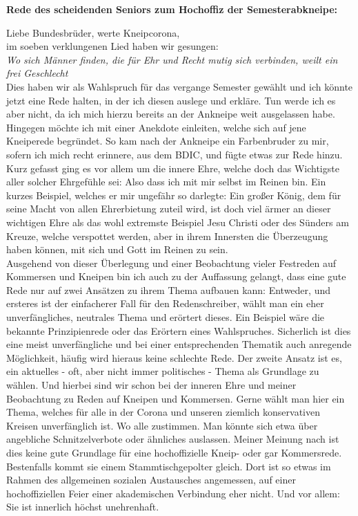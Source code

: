 \begin{multicols}{2}
\textbf{Rede des scheidenden Seniors zum Hochoffiz der Semesterabkneipe:}

Liebe Bundesbrüder, werte Kneipcorona,
\\
im soeben verklungenen Lied haben wir gesungen:
\\
\glqq\textit{Wo sich Männer finden, die für Ehr und Recht
mutig sich verbinden, weilt ein frei Geschlecht}\grqq
\\
Dies haben wir als Wahlspruch für das vergange Semester gewählt und ich könnte jetzt eine Rede halten, in der ich diesen auslege und erkläre. Tun werde ich es aber nicht, da ich mich hierzu bereits an der Ankneipe weit ausgelassen habe.
Hingegen möchte ich mit einer Anekdote einleiten, welche sich auf jene Kneiperede begründet. So kam nach der Ankneipe ein Farbenbruder zu mir, sofern ich mich recht erinnere, aus dem BDIC, und fügte etwas zur Rede hinzu. Kurz gefasst ging es vor allem um die innere Ehre, welche doch das Wichtigste aller solcher Ehrgefühle sei: Also dass ich mit mir selbst im Reinen bin. Ein kurzes Beispiel, welches er mir ungefähr so darlegte: Ein großer König, dem für seine Macht von allen Ehrerbietung zuteil wird, ist doch viel ärmer an dieser wichtigen Ehre als das wohl extremste Beispiel Jesu Christi oder des Sünders am Kreuze, welche verspottet werden, aber in ihrem Innersten die Überzeugung haben können, mit sich und Gott im Reinen zu sein.
\\
Ausgehend von dieser Überlegung und einer Beobachtung vieler Festreden auf Kommersen und Kneipen bin ich auch zu der Auffassung gelangt, dass eine gute Rede nur auf zwei Ansätzen zu ihrem Thema aufbauen kann: Entweder, und ersteres ist der einfacherer Fall für den Redenschreiber, wählt man ein eher unverfängliches, neutrales Thema und erörtert dieses. Ein Beispiel wäre die bekannte Prinzipienrede oder das Erörtern eines Wahlspruches. Sicherlich ist dies eine meist unverfängliche und bei einer entsprechenden Thematik auch anregende Möglichkeit, häufig wird hieraus keine schlechte Rede. Der zweite Ansatz ist es, ein aktuelles - oft, aber nicht immer politisches - Thema als Grundlage zu wählen.
Und hierbei sind wir schon bei der inneren Ehre und meiner Beobachtung zu Reden auf Kneipen und Kommersen. Gerne wählt man hier ein Thema, welches für alle in der Corona und unseren ziemlich konservativen Kreisen unverfänglich ist. Wo alle zustimmen. Man könnte sich etwa über angebliche Schnitzelverbote oder ähnliches auslassen. Meiner Meinung nach ist dies keine gute Grundlage für eine hochoffizielle Kneip- oder gar Kommersrede. Bestenfalls kommt sie einem Stammtischgepolter gleich. Dort ist so etwas im Rahmen des allgemeinen sozialen Austausches angemessen, auf einer hochoffiziellen Feier einer akademischen Verbindung eher nicht. Und vor allem: Sie ist innerlich höchst unehrenhaft.

\end{multicols}
